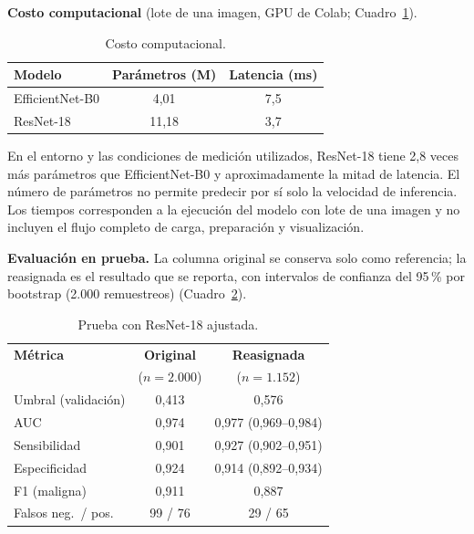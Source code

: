\documentclass[conference]{IEEEtran}
\begin{document}
	\textbf{Costo computacional} (lote de una imagen, GPU de Colab; Cuadro~\ref{tab:costo}).
	
	\begin{table}[H]
		\centering
		\caption{Costo computacional.}
		\label{tab:costo}
		\begin{tabular}{@{}lcc@{}}
			\toprule
			\textbf{Modelo} & \textbf{Parámetros (M)} & \textbf{Latencia (ms)} \\
			\midrule
			EfficientNet-B0 & 4,01  & 7,5 \\
			ResNet-18       & 11,18 & 3,7 \\
			\bottomrule
		\end{tabular}
	\end{table}
	
	En el entorno y las condiciones de medición utilizados, ResNet-18 tiene 2,8 veces más parámetros que EfficientNet-B0 y aproximadamente la mitad de latencia. El número de parámetros no permite predecir por sí solo la velocidad de inferencia. Los tiempos corresponden a la ejecución del modelo con lote de una imagen y no incluyen el flujo completo de carga, preparación y visualización.
	
	\textbf{Evaluación en prueba.} La columna original se conserva solo como referencia; la reasignada es el resultado que se reporta, con intervalos de confianza del 95\,\% por bootstrap (2.000 remuestreos) (Cuadro~\ref{tab:test}).
	
	\begin{table}[H]
		\centering
		\caption{Prueba con ResNet-18 ajustada.}
		\label{tab:test}
		\footnotesize
		\begin{tabular}{@{}lcc@{}}
			\toprule
			\textbf{Métrica} & \textbf{Original} & \textbf{Reasignada} \\
			& ($n = 2.000$) & ($n = 1.152$) \\
			\midrule
			Umbral (validación)   & 0,413   & 0,576 \\
			AUC                   & 0,974   & 0,977 (0,969--0,984) \\
			Sensibilidad          & 0,901   & 0,927 (0,902--0,951) \\
			Especificidad         & 0,924   & 0,914 (0,892--0,934) \\
			F1 (maligna)          & 0,911   & 0,887 \\
			Falsos neg.\ / pos.   & 99 / 76 & 29 / 65 \\
			\bottomrule
		\end{tabular}
	\end{table}
\end{document}
